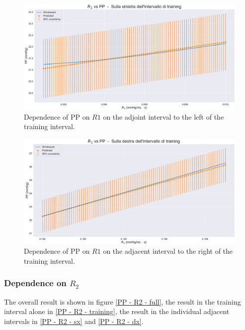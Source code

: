 \begin{figure}
    \centering
    \includegraphics[width=1\textwidth]{images/Training (risultati)/PP/PP - R1 - sx.pdf}
    \caption{Dependence of PP on $R1$ on the adjoint interval to the left of the training interval.}
    \label{PP - R1 - sx}
\end{figure}



\begin{figure}
    \centering
    \includegraphics[width=1\textwidth]{images/Training (risultati)/PP/PP - R1 - dx.pdf}
    \caption{Dependence of PP on $R1$ on the adjacent interval to the right of the training interval.}
    \label{PP - R1 - dx}
\end{figure}

\newpage


\subsubsection{Dependence on $R_2$}
The overall result is shown in figure \ref{PP - R2 - full}, the result in the training interval alone in \ref{PP - R2 - training}, the result in the individual adjacent intervals in \ref{PP - R2 - sx} and \ref{PP - R2 - dx}.

